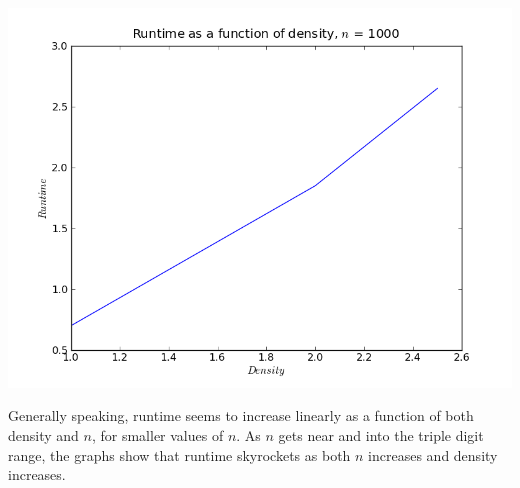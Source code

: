 \documentclass{article}
\begin{document}
\includegraphics[scale=0.5]{timen1000.png}

Generally speaking, runtime seems to increase linearly as a function of both
density and $n$, for smaller values of $n$. As $n$ gets near and into the
triple digit range, the graphs show that runtime skyrockets as both $n$
increases and density increases.
\end{document}
